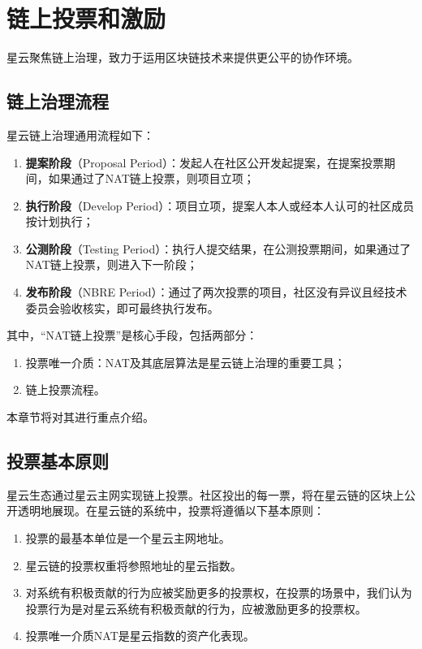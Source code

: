 \section{链上投票和激励}

星云聚焦链上治理，致力于运用区块链技术来提供更公平的协作环境。

\subsection{链上治理流程}
\label{governance}

星云链上治理通用流程如下：

\begin{enumerate}
	\item \textbf{提案阶段}（Proposal Period）：发起人在社区公开发起提案，在提案投票期间，如果通过了NAT链上投票，则项目立项；
	\item \textbf{执行阶段}（Develop Period）：项目立项，提案人本人或经本人认可的社区成员按计划执行；
	\item \textbf{公测阶段}（Testing Period）：执行人提交结果，在公测投票期间，如果通过了NAT链上投票，则进入下一阶段；
	\item \textbf{发布阶段}（NBRE Period）：通过了两次投票的项目，社区没有异议且经技术委员会验收核实，即可最终执行发布。
\end{enumerate}

其中，“NAT链上投票”是核心手段，包括两部分：

\begin{enumerate}
	\item 投票唯一介质：NAT及其底层算法是星云链上治理的重要工具；
	\item 链上投票流程。
\end{enumerate}

本章节将对其进行重点介绍。

\subsection{投票基本原则}

星云生态通过星云主网实现链上投票。社区投出的每一票，将在星云链的区块上公开透明地展现。在星云链的系统中，投票将遵循以下基本原则：

\begin{enumerate}
	\item 投票的最基本单位是一个星云主网地址。
	\item 星云链的投票权重将参照地址的星云指数。
	\item 对系统有积极贡献的行为应被奖励更多的投票权，在投票的场景中，我们认为投票行为是对星云系统有积极贡献的行为，应被激励更多的投票权。
	\item 投票唯一介质NAT是星云指数的资产化表现。
\end{enumerate}

